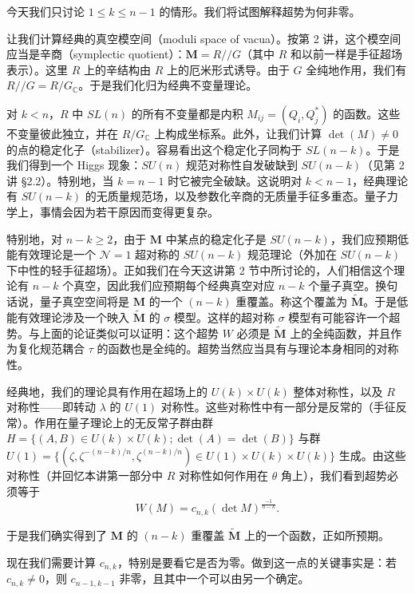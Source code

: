 今天我们只讨论 $1\le k\le n-1$ 的情形。我们将试图解释超势为何非零。

让我们计算经典的真空模空间（moduli space of vacua）。按第 2 讲，这个模空间应当是辛商（symplectic quotient）：$\mathbf{M}=R//G$（其中 $R$ 和以前一样是手征超场表示）。这里 $R$ 上的辛结构由 $R$ 上的厄米形式诱导。由于 $G$ 全纯地作用，我们有 $R//G=R/G_{\mathbb{C}}$。于是我们化归为经典不变量理论。

对 $k<n$，$R$ 中 $SL(n)$ 的所有不变量都是内积 $M_{ij}=(Q_i,Q_j^*)$ 的函数。这些不变量彼此独立，并在 $R/G_{\mathbb{C}}$ 上构成坐标系。此外，让我们计算 $\det(M)\ne0$ 的点的稳定化子（stabilizer）。容易看出这个稳定化子同构于 $SL(n-k)$。于是我们得到一个 Higgs 现象：$SU(n)$ 规范对称性自发破缺到 $SU(n-k)$（见第 2 讲 §2.2）。特别地，当 $k=n-1$ 时它被完全破缺。这说明对 $k<n-1$，经典理论有 $SU(n-k)$ 的无质量规范场，以及参数化辛商的无质量手征多重态。量子力学上，事情会因为若干原因而变得更复杂。

特别地，对 $n-k\ge2$，由于 $\mathbf{M}$ 中某点的稳定化子是 $SU(n-k)$，我们应预期低能有效理论是一个 $\mathcal{N}=1$ 超对称的 $SU(n-k)$ 规范理论（外加在 $SU(n-k)$ 下中性的轻手征超场）。正如我们在今天这讲第 2 节中所讨论的，人们相信这个理论有 $n-k$ 个真空，因此我们应预期每个经典真空对应 $n-k$ 个量子真空。换句话说，量子真空空间将是 $\mathbf{M}$ 的一个 $(n-k)$ 重覆盖。称这个覆盖为 $\widetilde{\mathbf{M}}$。于是低能有效理论涉及一个映入 $\widetilde{\mathbf{M}}$ 的 $\sigma$ 模型。这样的超对称 $\sigma$ 模型有可能容许一个超势。与上面的论证类似可以证明：这个超势 $W$ 必须是 $\widetilde{\mathbf{M}}$ 上的全纯函数，并且作为复化规范耦合 $\tau$ 的函数也是全纯的。超势当然应当具有与理论本身相同的对称性。

经典地，我们的理论具有作用在超场上的 $U(k)\times U(k)$ 整体对称性，以及 $R$ 对称性——即转动 $\lambda$ 的 $U(1)$ 对称性。这些对称性中有一部分是反常的（手征反常）。作用在量子理论上的无反常子群由群 $H=\{(A,B)\in U(k)\times U(k);\det(A)=\det(B)\}$ 与群 $U(1)=\{(\zeta,\zeta^{-(n-k)/n},\zeta^{(n-k)/n})\in U(1)\times U(k)\times U(k)\}$ 生成。由这些对称性（并回忆本讲第一部分中 $R$ 对称性如何作用在 $\theta$ 角上），我们看到超势必须等于
\begin{equation}
  \tag{16.10}
  \label{eq:16-10}
  W(M)=c_{n,k}(\det M)^{\frac{-1}{n-k}} .
\end{equation}

于是我们确实得到了 $\mathbf{M}$ 的 $(n-k)$ 重覆盖 $\widetilde{\mathbf{M}}$ 上的一个函数，正如所预期。

现在我们需要计算 $c_{n,k}$，特别是要看它是否为零。做到这一点的关键事实是：若 $c_{n,k}\ne0$，则 $c_{n-1,k-1}$ 非零，且其中一个可以由另一个确定。

